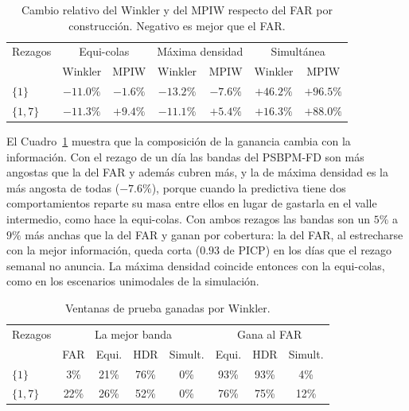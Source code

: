 \begin{table}[H]
\centering\small
\setlength{\tabcolsep}{3pt}
\caption{Cambio relativo del Winkler y del MPIW respecto del FAR por construcción. Negativo es mejor que el FAR.}
\label{tab:apl_bloqueB_ganancia}
\begin{tabular}{l cc cc cc}
\hline
Rezagos & \multicolumn{2}{c}{Equi-colas} & \multicolumn{2}{c}{Máxima densidad} & \multicolumn{2}{c}{Simultánea} \\
 & Winkler & MPIW & Winkler & MPIW & Winkler & MPIW \\
\hline
$\{1\}$ & $-11.0\%$ & $-1.6\%$ & $-13.2\%$ & $-7.6\%$ & $+46.2\%$ & $+96.5\%$ \\
$\{1,7\}$ & $-11.3\%$ & $+9.4\%$ & $-11.1\%$ & $+5.4\%$ & $+16.3\%$ & $+88.0\%$ \\
\hline
\end{tabular}
\end{table}

El Cuadro~\ref{tab:apl_bloqueB_ganancia} muestra que la composición de la ganancia cambia con la información. Con el rezago de un día las bandas del PSBPM-FD son más angostas que la del FAR y además cubren más, y la de máxima densidad es la más angosta de todas ($-7.6\%$), porque cuando la predictiva tiene dos comportamientos reparte su masa entre ellos en lugar de gastarla en el valle intermedio, como hace la equi-colas. Con ambos rezagos las bandas son un $5\%$ a $9\%$ más anchas que la del FAR y ganan por cobertura: la del FAR, al estrecharse con la mejor información, queda corta ($0.93$ de PICP) en los días que el rezago semanal no anuncia. La máxima densidad coincide entonces con la equi-colas, como en los escenarios unimodales de la simulación.

\begin{table}[H]
\centering\small
\setlength{\tabcolsep}{3.5pt}
\caption{Ventanas de prueba ganadas por Winkler.}
\label{tab:apl_bloqueB_ventanas}
\begin{tabular}{l cccc ccc}
\hline
Rezagos & \multicolumn{4}{c}{La mejor banda} & \multicolumn{3}{c}{Gana al FAR} \\
 & FAR & Equi. & HDR & Simult. & Equi. & HDR & Simult. \\
\hline
$\{1\}$ & 3\% & 21\% & 76\% & 0\% & 93\% & 93\% & 4\% \\
$\{1,7\}$ & 22\% & 26\% & 52\% & 0\% & 76\% & 75\% & 12\% \\
\hline
\end{tabular}
\end{table}

